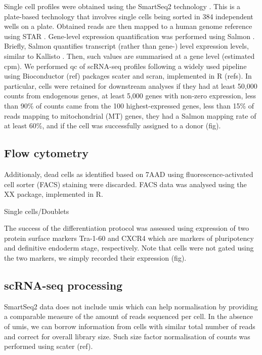 Single cell profiles were obtained using the SmartSeq2 technology \cite{picelli2013smart}. 
This is a plate-based technology that involves single cells being sorted in 384 independent wells on a plate. 
Obtained reads are then mapped to a human genome reference using STAR \cite{dobin2013star}. 
Gene-level expression quantification was performed using Salmon \cite{patro2017salmon}. 
Briefly, Salmon quantifies transcript (rather than gene-) level expression levels, similar to Kallisto \cite{bray2016near}.
Then, such values are summarised at a gene level (estimated \gls{cpm}).
We performed \gls{qc} of scRNA-seq profiles following a widely used pipeline using Bioconductor (ref) packages scater \cite{mccarthy2017scater} and scran, implemented in R (refs).  
In particular, cells were retained for downstream analyses if they had at least 50,000 counts from endogenous genes, at least 5,000 genes with non-zero expression, less than 90\% of counts came from the 100 highest-expressed genes, less than 15\% of reads mapping to mitochondrial (MT) genes, they had a Salmon mapping rate of at least 60\%, and if the cell was successfully assigned to a donor (fig).  

\subsection{Flow cytometry}

Additionaly, dead cells as identified based on 7AAD using fluorescence-activated cell sorter (FACS) staining were discarded. 
FACS data was analysed using the XX package, implemented in R. 

Single cells/Doublets

The success of the differentiation protocol was assessed using expression of two protein surface markers Tra-1-60 and CXCR4 which are markers of pluripotency and definitive endoderm stage, respectively. 
Note that cells were not gated using the two markers, we simply recorded their expression (fig). 

\subsection{scRNA-seq processing}

SmartSeq2 data does not include \gls{umis} which can help normalisation by providing a comparable measure of the amount of reads sequenced per cell. 
In the absence of \gls{umis}, we can borrow information from cells with similar total number of reads and correct for overall library size. 
Such size factor normalisation of counts was performed using scater (ref). 


